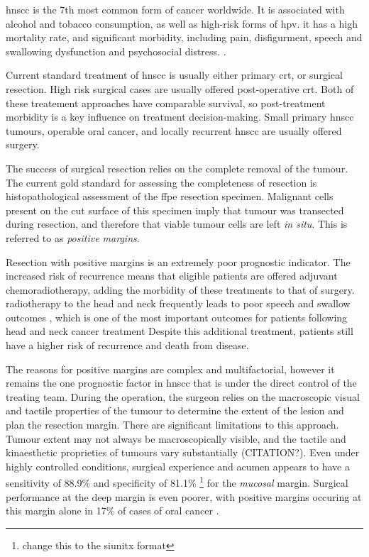 
\Gls{hnscc} is the 7th most common form of cancer worldwide. 
It is associated with alcohol and tobacco consumption, as well as high-risk forms of \gls{hpv}.
it has a high mortality rate, and significant morbidity, including pain, disfigurment, speech and swallowing dysfunction and psychosocial distress. \cite{chowHeadNeckCancer2020}.

Current standard treatment of \gls{hnscc} is usually either primary \gls{crt}, or surgical resection. 
High risk surgical cases are usually offered post-operative \gls{crt}.
Both of these treatement approaches have comparable survival, so post-treatment morbidity is a key influence on treatment decision-making.
Small primary \gls{hnscc} tumours, operable oral cancer, and locally recurrent \gls{hnscc} are usually offered surgery\cite{niceCancerUpperAerodigestive2018, kerawalaOralCavityLip2016}.

The success of surgical resection relies on the complete removal of the tumour.
The current gold standard for assessing the completeness of resection is histopathological assessment of the \gls{ffpe} resection specimen\cite{helliwellPathologicalAspectsAssessment2016}.
Malignant cells present on the cut surface of this specimen imply that tumour was transected during resection, and therefore that viable tumour cells are left \textit{in situ}.
This is referred to as \emph{positive margins}.

Resection with positive margins is an extremely poor prognostic indicator.
The increased risk of recurrence means that eligible patients are offered adjuvant chemoradiotherapy, adding the morbidity of these treatments to that of surgery.
radiotherapy to the head and neck frequently leads to poor speech and swallow outcomes \cite{machtayFactorsAssociatedSevere2008, wangPharyngoesophagealStrictureTreatment2012}, which is one of the most important outcomes for patients following head and neck cancer treatment \cite{wilsonDysphagiaNonsurgicalHead2011} 
Despite this additional treatment, patients still have a higher risk of recurrence and death from disease.

The reasons for positive margins are complex and multifactorial, however it remains the one prognostic factor in \gls{hnscc} that is under the direct control of the treating team.
During the operation, the surgeon relies on the macroscopic visual and tactile properties of the tumour to determine the extent of the lesion and plan the resection margin.
There are significant limitations to this approach. 
Tumour extent may not always be macroscopically visible, and the tactile and kinaesthetic proprieties of tumours vary substantially (CITATION?).
Even under highly controlled conditions, surgical experience and acumen appears to have a sensitivity of 88.9\% and specificity of 81.1\% \footnote{change this to the siunitx format} \cite{chaturvedip.GrossExaminationSurgeon2014} for the \emph{mucosal} margin.
Surgical performance at the deep margin is even poorer, with positive margins occuring at this margin alone in 17\% of cases of oral cancer \cite{woolgarHistopathologicalAppraisalSurgical2005}.

